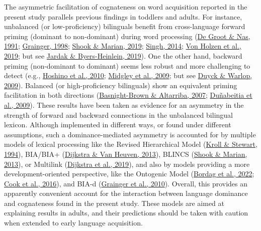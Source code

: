 \documentclass[
]{article}
\begin{document}
The asymmetric facilitation of cognateness on word acquisition reported
in the present study parallels previous findings in toddlers and adults.
For instance, unbalanced (or low-proficiency) bilinguals benefit from
cross-language forward priming (dominant to non-dominant) during word
processing (\protect\hyperlink{ref-de1991lexical}{De Groot \& Nas,
1991}; \protect\hyperlink{ref-grainger1998masked}{Grainger, 1998};
\protect\hyperlink{ref-shook2019covert}{Shook \& Marian, 2019};
\protect\hyperlink{ref-singh2014one}{Singh, 2014};
\protect\hyperlink{ref-vonholzen2019impact}{Von Holzen et al., 2019};
but see \protect\hyperlink{ref-jardak2019labels}{Jardak \&
Byers-Heinlein, 2019}). One the other hand, backward priming
(non-dominant to dominant) seems less robust and more challenging to
detect (e.g., \protect\hyperlink{ref-hoshino2010erp}{Hoshino et al.,
2010}; \protect\hyperlink{ref-midgley2009language}{Midgley et al.,
2009}; but see \protect\hyperlink{ref-duyck2009translation}{Duyck \&
Warlop, 2009}). Balanced (or high-proficiency bilinguals) show an
equivalent priming facilitation in both directions
(\protect\hyperlink{ref-basnight2007differences}{Basnight-Brown \&
Altarriba, 2007};
\protect\hyperlink{ref-dunabeitia2009masked}{Duñabeitia et al., 2009}).
These results have been taken as evidence for an asymmetry in the
strength of forward and backward connections in the unbalanced bilingual
lexicon. Although implemented in different ways, or found under
different assumptions, such a dominance-mediated asymmetry is accounted
for by multiple models of lexical processing like the Revised
Hierarchical Model (\protect\hyperlink{ref-kroll1994category}{Kroll \&
Stewart, 1994}), BIA/BIA+
(\protect\hyperlink{ref-dijkstra2013bia}{Dijkstra \& Van Heuven, 2013}),
BLINCS (\protect\hyperlink{ref-shook2013bilingual}{Shook \& Marian,
2013}), or Multilink
(\protect\hyperlink{ref-dijkstra2019multilink}{Dijkstra et al., 2019}),
and also by models providing a more development-oriented perspective,
like the Ontogenic Model
(\protect\hyperlink{ref-bordag2022ontogenesis}{Bordag et al., 2022};
\protect\hyperlink{ref-cook2016fuzzy}{Cook et al., 2016}), and BIA-d
(\protect\hyperlink{ref-grainger2010re}{Grainger et al., 2010}).
Overall, this provides an apparently convenient account for the
interaction between language dominance and cognateness found in the
present study. These models are aimed at explaining results in adults,
and their predictions should be taken with caution when extended to
early language acquisition.
\end{document}
